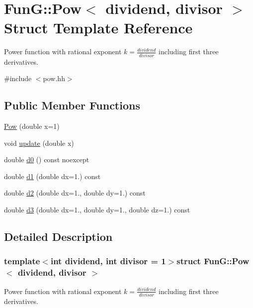 \hypertarget{structFunG_1_1Pow}{\section{\-Fun\-G\-:\-:\-Pow$<$ dividend, divisor $>$ \-Struct \-Template \-Reference}
\label{structFunG_1_1Pow}
}


\-Power function with rational exponent $ k = \frac{dividend}{divisor} $ including first three derivatives.  




{\ttfamily \#include $<$pow.\-hh$>$}

\subsection*{\-Public \-Member \-Functions}
\begin{DoxyCompactItemize}
\item 
\hyperlink{structFunG_1_1Pow_a80be1d3a5c208e7ac74efa7ff3a7a18f}{\-Pow} (double x=1)
\item 
void \hyperlink{structFunG_1_1Pow_a2cb004b3cb89c4887b67eb8e666f4852}{update} (double x)
\item 
double \hyperlink{structFunG_1_1Pow_a840ccc0dbcfabc71863d2932074b955a}{d0} () const noexcept
\item 
double \hyperlink{structFunG_1_1Pow_a9e1301ef812a58af196556bc2b33b7c0}{d1} (double dx=1.) const 
\item 
double \hyperlink{structFunG_1_1Pow_ac3b7b762a8609b5c2ea57831acd04870}{d2} (double dx=1., double dy=1.) const 
\item 
double \hyperlink{structFunG_1_1Pow_a5ad0887482ea7a9f146d9dc41742c11a}{d3} (double dx=1., double dy=1., double dz=1.) const 
\end{DoxyCompactItemize}


\subsection{\-Detailed \-Description}
\subsubsection*{template$<$int dividend, int divisor = 1$>$struct Fun\-G\-::\-Pow$<$ dividend, divisor $>$}

\-Power function with rational exponent $ k = \frac{dividend}{divisor} $ including first three derivatives. 

